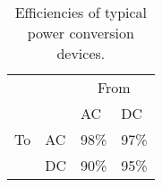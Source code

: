 \begin{table}%
\centering
\caption{Efficiencies of typical power conversion devices.}
\label{tab:conv_eff}
\begin{tabular}{ll l l }
	\toprule
	   &                        & \multicolumn{2}{c}{From}                         \\ \cline{3-4}
	   &                        & AC                       & DC                      \\ 
	\midrule
	To & \multicolumn{1}{l}{AC} & 98\% \cite{Starke2008}   & 97\%  \cite{Starke2008} \\
	   & \multicolumn{1}{l}{DC} & 90\% \cite{Pang2006}     & 95\% \cite{Starke2008}  \\

	\bottomrule
\end{tabular}
\end{table}
